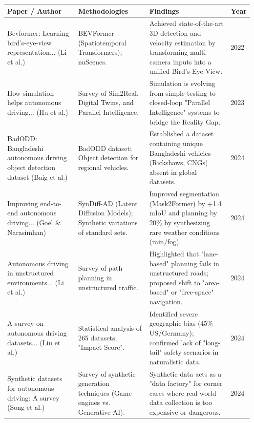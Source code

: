 \begin{table}[h!]
    \centering
    \begin{tabular}{|p{3.5cm}|p{4cm}|p{3.9cm}|p{1.9cm}|}
    \hline
    \textbf{Paper / Author} & \textbf{Methodologies} & \textbf{Findings}& \textbf{Year}\\
    \hline
    Bevformer: Learning bird’s-eye-view representation... (Li et al.) & 
    BEVFormer (Spatiotemporal Transformers); nuScenes. & 
    Achieved state-of-the-art 3D detection and velocity estimation by transforming multi-camera inputs into a unified Bird's-Eye-View. & 
    2022 \\
    \hline
    How simulation helps autonomous driving... (Hu et al.) & 
    Survey of Sim2Real, Digital Twins, and Parallel Intelligence. & 
    Simulation is evolving from simple testing to closed-loop "Parallel Intelligence" systems to bridge the Reality Gap. & 
    2023 \\
    \hline
    BadODD: Bangladeshi autonomous driving object detection dataset (Baig et al.) & 
    BadODD dataset; Object detection for regional vehicles. & 
    Established a dataset containing unique Bangladeshi vehicles (Rickshaws, CNGs) absent in global datasets. & 
    2024 \\
    \hline
    Improving end-to-end autonomous driving... (Goel \& Narasimhan) & 
    SynDiff-AD (Latent Diffusion Models); Synthetic variations of standard sets. & 
    Improved segmentation (Mask2Former) by +1.4 mIoU and planning by 20\% by synthesizing rare weather conditions (rain/fog). & 
    2024 \\
    \hline
    Autonomous driving in unstructured environments... (Li et al.) & 
    Survey of path planning in unstructured traffic. & 
    Highlighted that "lane-based" planning fails in unstructured roads; proposed shift to "area-based" or "free-space" navigation. & 
    2024 \\
    \hline
    A survey on autonomous driving datasets... (Liu et al.) & 
    Statistical analysis of 265 datasets; "Impact Score". & 
    Identified severe geographic bias (45\% US/Germany); confirmed lack of "long-tail" safety scenarios in naturalistic data. & 
    2024 \\
    \hline
    Synthetic datasets for autonomous driving: A survey (Song et al.) & 
    Survey of synthetic generation techniques (Game engines vs. Generative AI). & 
    Synthetic data acts as a "data factory" for corner cases where real-world data collection is too expensive or dangerous. & 
    2024 \\
    \hline
    \end{tabular}
\end{table}
